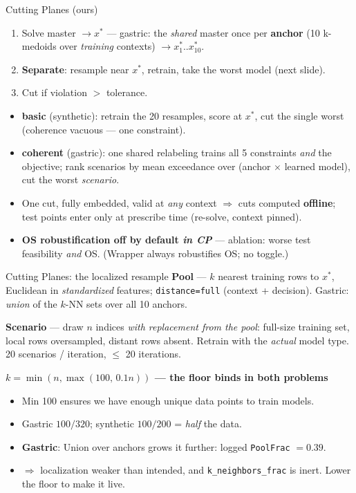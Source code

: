 \documentclass{beamer}
\begin{document}
\begin{frame}{Cutting Planes (ours)}
  \small
  \begin{enumerate}
    \item Solve master $\to x^\ast$ --- gastric: the \emph{shared} master once per
      \textbf{anchor} (10 k-medoids over \emph{training} contexts) $\to x^\ast_1..x^\ast_{10}$.
    \item \textbf{Separate}: resample near $x^\ast$, retrain, take the worst model
      (next slide).
    \item Cut if violation $>$ tolerance.
  \end{enumerate}
  \begin{itemize}
    \item \textbf{basic} (synthetic): retrain the 20 resamples, score at $x^\ast$,
      cut the single worst (coherence vacuous --- one constraint).
    \item \textbf{coherent} (gastric): one shared relabeling trains all 5 constraints
      \emph{and} the objective; rank scenarios by mean exceedance over
      (anchor $\times$ learned model), cut the worst \emph{scenario}.
    \item One cut, fully embedded, valid at \emph{any} context $\Rightarrow$ cuts computed
      \textbf{offline}; test points enter only at prescribe time (re-solve, context pinned).
    \item \textbf{OS robustification off by default \emph{in CP}} --- ablation: worse test
      feasibility \emph{and} OS. (Wrapper always robustifies OS; no toggle.)
  \end{itemize}
\end{frame}

\begin{frame}{Cutting Planes: the localized resample}
  \small
  \textbf{Pool} --- $k$ nearest training rows to $x^\ast$, Euclidean in
  \emph{standardized} features; \texttt{distance=full} (context + decision).
  Gastric: \emph{union} of the $k$-NN sets over all 10 anchors.
  \medskip

  \textbf{Scenario} --- draw $n$ indices \emph{with replacement from the pool}:
  full-size training set, local rows oversampled, distant rows absent.
  Retrain with the \emph{actual} model type.
  20 scenarios / iteration, $\le$ 20 iterations.
  \medskip

  \textbf{$k=\min(n,\max(100,\,0.1n))$ --- the floor binds in both problems}
  \begin{itemize}
    \item Min 100 ensures we have enough unique data points to train models.
    \item Gastric $100/320$; synthetic $100/200$ = \emph{half} the data.
    \item \textbf{Gastric}: Union over anchors grows it further: logged \texttt{PoolFrac} $=0.39$.
    \item $\Rightarrow$ localization weaker than intended, and
      \texttt{k\_neighbors\_frac} is inert. Lower the floor to make it live.
  \end{itemize}
\end{frame}
\end{document}
